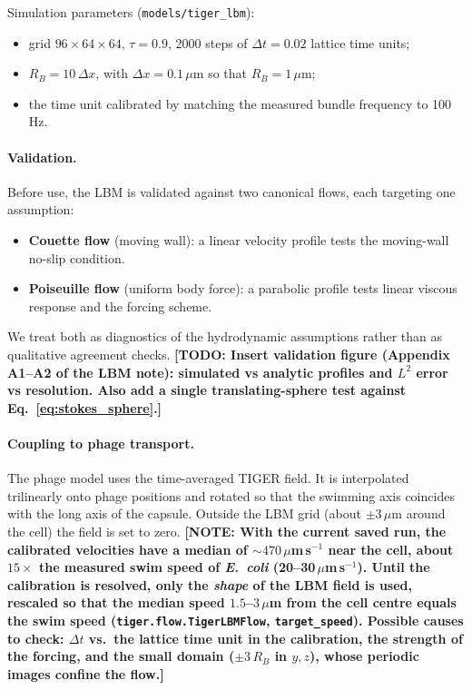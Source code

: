 \documentclass[12pt]{article}
\newcommand{\note}[1]{{\color{red}\textbf{[NOTE: #1]}}}
\newcommand{\todo}[1]{{\color{blue}\textbf{[TODO: #1]}}}
\begin{document}
Simulation parameters (\texttt{models/tiger\_lbm}):
\begin{itemize}\setlength\itemsep{0pt}
\item grid $96\times64\times64$, $\tau=0.9$, 2000 steps of $\Delta t=0.02$ lattice time units;
\item $R_B=10\,\Delta x$, with $\Delta x=0.1\,\mu$m so that $R_B=1\,\mu$m;
\item the time unit calibrated by matching the measured bundle frequency to 100\,Hz.
\end{itemize}

\paragraph{Validation.} Before use, the LBM is validated against two canonical flows, each targeting one assumption:
\begin{itemize}\setlength\itemsep{0pt}
\item \textbf{Couette flow} (moving wall): a linear velocity profile tests the moving-wall no-slip condition.
\item \textbf{Poiseuille flow} (uniform body force): a parabolic profile tests linear viscous response and the forcing scheme.
\end{itemize}
We treat both as diagnostics of the hydrodynamic assumptions rather than as qualitative agreement checks. \todo{Insert validation figure (Appendix A1--A2 of the LBM note): simulated vs analytic profiles and $L^2$ error vs resolution. Also add a single translating-sphere test against Eq.~\eqref{eq:stokes_sphere}.}

\paragraph{Coupling to phage transport.} The phage model uses the time-averaged TIGER field. It is interpolated trilinearly onto phage positions and rotated so that the swimming axis coincides with the long axis of the capsule. Outside the LBM grid (about $\pm3\,\mu$m around the cell) the field is set to zero. \note{With the current saved run, the calibrated velocities have a median of $\sim\!470\,\mu$m\,s$^{-1}$ near the cell, about $15\times$ the measured swim speed of \textit{E.~coli} (20--30\,$\mu$m\,s$^{-1}$). Until the calibration is resolved, only the \emph{shape} of the LBM field is used, rescaled so that the median speed $1.5$--$3\,\mu$m from the cell centre equals the swim speed (\texttt{tiger.flow.TigerLBMFlow}, \texttt{target\_speed}). Possible causes to check: $\Delta t$ vs.\ the lattice time unit in the calibration, the strength of the forcing, and the small domain ($\pm3\,R_B$ in $y,z$), whose periodic images confine the flow.}
\end{document}
